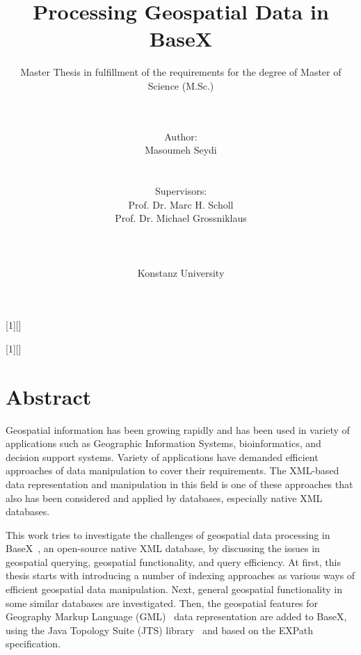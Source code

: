 \documentclass[a4paper,12pt]{article}
\title{Processing Geospatial Data in BaseX}
\subtitle{Master Thesis in fulfillment of the requirements for the degree of
Master of Science (M.Sc.)}
\author{\\\\Author: \\
	Masoumeh Seydi
	\\\\\\Supervisors: \\
	Prof. Dr. Marc H. Scholl \\
	Prof. Dr. Michael Grossniklaus\\ 
	\\\\\\
	Konstanz University}
\begin{document}
[1][]{
\lstset{#1}}{}

[1][]{
\lstset{#1}}{}


\renewcommand{\lstlistingname}{Code}


\maketitle
\thispagestyle{empty}

\newpage
\section*{Abstract}
Geospatial information has been growing rapidly and has been used in variety of applications 
such as Geographic Information Systems, bioinformatics, and decision support systems. 
Variety of applications have demanded efficient approaches of data manipulation to cover their requirements. 
The XML-based data representation and manipulation in this field is one of these approaches that also has been considered and applied by databases, especially native XML databases. 

This work tries to investigate the challenges of geospatial data processing in BaseX~\cite{www/basex}, an open-source native XML database, by discussing the issues in geospatial querying, geospatial functionality, and query efficiency. 
At first, this thesis starts with introducing a number of indexing approaches as various ways of efficient geospatial data manipulation. 
Next, general geospatial functionality in some similar databases are investigated. 
Then, the geospatial features for Geography Markup Language (GML)~\cite{gml} data representation are added to BaseX, 
using the Java Topology Suite (JTS) library~\cite{jts} and based on the EXPath specification.
\end{document}
